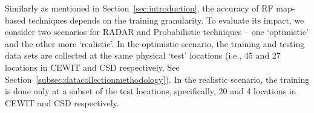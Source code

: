 Similarly as mentioned in Section~\ref{sec:introduction},
the accuracy of RF map-based techniques depends on the training granularity. 
To evaluate its impact, we consider two scenarios for RADAR and
Probabilistic techniques -- one `optimistic' and the other more `realistic'. In
the optimistic scenario, the training and testing data sets are collected at the same physical `test' locations (i.e., 45 and 27 locations in CEWIT and CSD respectively. See Section~\ref{subsec:datacollectionmethodology}). In the realistic scenario, the training is done only at a subset 
of the test locations, specifically, 20 and 4 locations in CEWIT and CSD respectively. 

%

%

